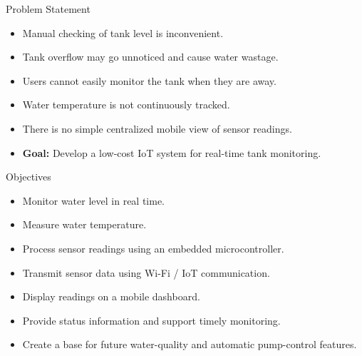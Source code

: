 \documentclass[aspectratio=169]{beamer}
\begin{document}

\begin{frame}{Problem Statement}

\begin{itemize}

    \item Manual checking of tank level is inconvenient.

    \item Tank overflow may go unnoticed and cause water wastage.

    \item Users cannot easily monitor the tank when they are away.

    \item Water temperature is not continuously tracked.

    \item There is no simple centralized mobile view of sensor readings.

    \item \textbf{Goal:} Develop a low-cost IoT system for
    real-time tank monitoring.

\end{itemize}

\end{frame}


\begin{frame}{Objectives}

\begin{itemize}

    \item Monitor water level in real time.

    \item Measure water temperature.

    \item Process sensor readings using an embedded microcontroller.

    \item Transmit sensor data using Wi-Fi / IoT communication.

    \item Display readings on a mobile dashboard.

    \item Provide status information and support timely monitoring.

    \item Create a base for future water-quality and automatic
    pump-control features.

\end{itemize}

\end{frame}
\end{document}
